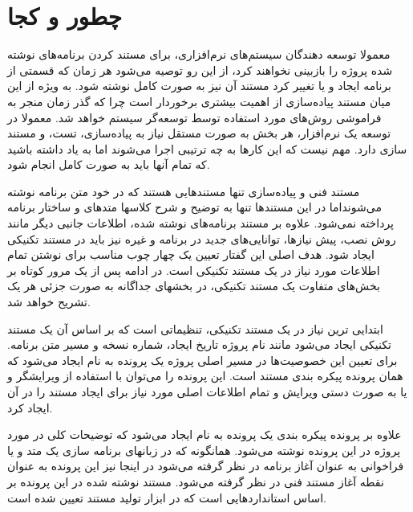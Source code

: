 
\chapter{چطور و کجا}

معمولا توسعه دهندگان سیستم‌های نرم‌افزاری، برای مستند کردن برنامه‌های نوشته شده
پروژه را بازبینی نخواهند کرد، از این رو توصیه می‌شود هر زمان که قسمتی از برنامه ایجاد و یا تغییر کرد
مستند آن نیز به صورت کامل نوشته شود. به ویژه از این میان مستند پیاده‌سازی از اهمیت بیشتری
برخوردار است چرا که گذر زمان منجر به فراموشی روش‌های مورد استفاده توسط
توسعه‌‌گر سیستم خواهد شد. معمولا در توسعه یک نرم‌افزار، هر بخش به صورت
مستقل نیاز به پیاده‌سازی، تست، و مستند سازی دارد. مهم نیست که این کارها به چه
ترتیبی اجرا می‌شوند اما به یاد داشته باشید که تمام آنها باید به صورت کامل انجام
شود.

  مستند فنی و پیاده‌سازی تنها مستندهایی هستند که در خود متن برنامه نوشته
  می‌شونداما در این مستندها تنها به توضیح و شرح کلاسها متدهای و ساختار برنامه
  پرداخته نمی‌شود. علاوه بر مستند برنامه‌های نوشته شده،
  اطلاعات جانبی دیگر مانند روش نصب، پیش نیازها، توانایی‌های جدید در برنامه و
  غیره نیز باید در مستند تکنیکی ایجاد شود. هدف اصلی این گفتار
  تعیین یک چهار چوب مناسب برای نوشتن تمام اطلاعات مورد نیاز در یک مستند تکنیکی
  است. در ادامه پس  از یک مرور کوتاه بر بخش‌های متفاوت یک مستند تکنیکی، در
  بخشهای جداگانه به صورت جزئی هر یک تشریح خواهد شد.

  ابتدایی ترین نیاز در یک مستند تکنیکی، تنظیماتی است که بر اساس آن یک
  مستند تکنیکی ایجاد می‌شود مانند نام پروژه تاریخ ایجاد، شماره نسخه و مسیر متن
  برنامه. برای تعیین این خصوصیت‌ها در مسیر اصلی پروژه یک پرونده به نام
   ایجاد می‌شود که همان پرونده پیکره بندی مستند است. این پرونده را
  می‌توان با استفاده از ویرایشگر  و یا به صورت دستی ویرایش و
  تمام اطلاعات اصلی مورد نیاز برای ایجاد مستند را در آن ایجاد کرد.

  علاوه بر پرونده پیکره بندی یک پرونده به نام  ایجاد می‌شود که
  توضیحات کلی در مورد پروژه در این پرونده نوشته می‌شود. همانگونه که در زبانهای
  برنامه سازی یک متد و یا فراخوانی به عنوان آغاز برنامه در نظر گرفته می‌شود در
  اینجا نیز این پرونده به عنوان نقطه آغاز مستند فنی در نظر گرفته می‌شود. مستند
  نوشته شده در این پرونده بر اساس استانداردهایی است که در ابزار تولید مستند
   تعیین شده است.

